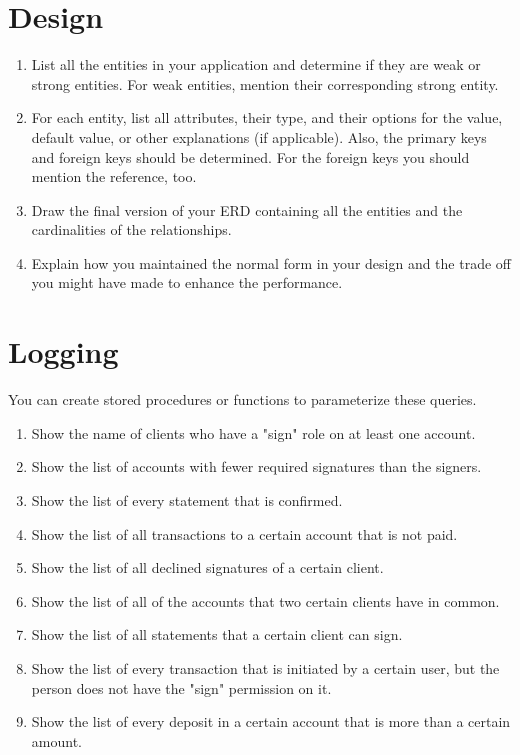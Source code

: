 \documentclass{homework}
\begin{document}
\section*{Design}
\begin{enumerate}
    \item List all the entities in your application and determine if they are weak or strong entities. For weak entities, mention their corresponding strong entity.

    \item For each entity, list all attributes, their type, and their options for the value, default value, or other explanations (if applicable). Also, the primary keys and foreign keys should be determined. For the foreign keys you should mention the reference, too. 
    
    \item Draw the final version of your ERD containing all the entities and the cardinalities of the relationships.

    \item Explain how you maintained the normal form in your design and the trade off you might have made to enhance the performance.

\end{enumerate}

\section*{Logging}
You can create stored procedures or functions to parameterize these queries.
\begin{enumerate}
    \item Show the name of clients who have a "sign" role on at least one account.
    \item Show the list of accounts with fewer required signatures than the signers.
    \item Show the list of every statement that is confirmed.
    \item Show the list of all transactions to a certain account that is not paid.
    \item Show the list of all declined signatures of a certain client.
    \item Show the list of all of the accounts that two certain clients have in common.
    \item Show the list of all statements that a certain client can sign.
    \item Show the list of every transaction that is initiated by a certain user, but the person does not have the "sign" permission on it.
    \item Show the list of every deposit in a certain account that is more than a certain amount.
\end{enumerate}
\end{document}
